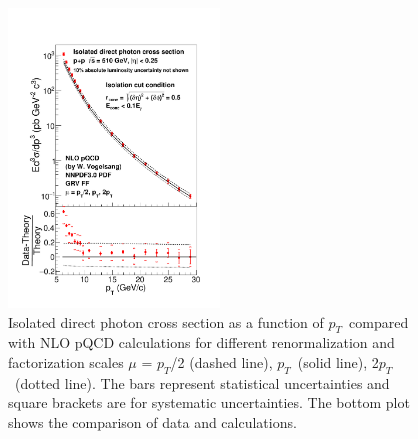 \documentclass[twocolumn,letterpaper,aps,prl,longbibliography,superscriptaddress,floatfix]{revtex4-2}
\newcommand{\pT}{\ensuremath{p_T}}
\newcommand{\pizero}{\ensuremath{\pi^0}}
\begin{document}
\begin{figure} 
\centering
\includegraphics[width=0.5\textwidth]{CrossSection-isophoton-werner}
\caption{Isolated direct photon cross section as a function of \pT\ compared with NLO pQCD calculations \cite{PhysRevD.48.3136,PhysRevD.50.1901} for different renormalization and factorization scales $\mu$ = \pT/2 (dashed line), \pT\ (solid line), 2\pT\ (dotted line). The bars represent statistical uncertainties and square brackets are for systematic uncertainties. The bottom plot shows the comparison of data and calculations.}
\label{fig:iso}
\end{figure}

\end{document}
